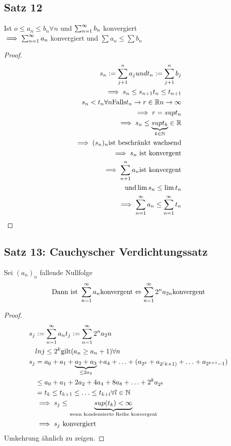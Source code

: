 \subsection{Satz 12}
Ist $o \le a_n \le b_n \forall n$ und $\sum_{n=1}^{\infty} b_n$ konvergiert \\
$ \implies \sum_{n=1}^{\infty} a_n$ konvergiert und $ \sum a_n \le \sum b_n$ \\
\begin{proof}
 \begin{equation}
  \begin{split}
    s_n := \sum_{j+1}^n a_j und t_n := \sum_{j+1}^n b_j \\
    \implies s_n \le s_{n+1} t_n \le t_{n+1} \\
    s_n < t_n \forall n 
    \text{Falls} t_n \to r \in \mathbb{R} n \to \infty \\
    \implies r = sup t_n \\
    \implies s_n \le \underbrace{sup t_k}_{k \in \mathbb{N}} \in \mathbb{R} \\
    \implies (s_n)_n \text{ist beschränkt wachsend} \\
    \implies s_n \text{ ist konvergent} \\
    \implies \sum_{n+1}^n a_n \text{ist konvergent} \\
    \text{und} \lim s_n \le \lim t_n \\
    \implies \sum_{n=1}^{\infty} a_n \le \sum_{n=1}^{\infty} t_n
   \end{split}
 \end{equation}
\end{proof}

\subsection{Satz 13: Cauchyscher Verdichtungssatz}
Sei $(a_n)_n$ fallende Nullfolge
\begin{equation}
 \text{Dann ist } \sum_{n=1}^{\infty} a_n \text{konvergent} \Leftrightarrow \sum_{n=1}^{\infty} 2^n a_{2n} \text{konvergent}
\end{equation}

\begin{proof}
 \begin{equation}
  \begin{split}
   s_j & := \sum_{n=1}^{\infty} a_n t_j := \sum_{n=1}^{\infty} 2^n a_2n \\
   & ln  j \le 2^k \text{gilt} (a_n \ge a_n+1) \forall n \\
   s_j &= a_0 + a_1 + \underbrace{a_2 + a_3}_{\le 2a_2} + a_4 + \ldots + (a_{2^k} + a_{2^(k+1)} + \ldots + a_{2^{k+1}-1}) \\
   & \le a_0 + a_1 + 2a_2 + 4 a_4 + 8 a_8 + \ldots + 2^k a_{2^k} \\
   & =t_k \le t_{k+1} \le \ldots \le t_{k+l} \forall l \in \mathbb{N} \\
   & \implies s_j \le \underbrace{sup(t_k) < \infty}_{\text{wenn kondensierte Reihe konvergent}} \\
   & \implies s_j \text{ konvergiert}
  \end{split}
 \end{equation}
Umkehrung ähnlich zu zeigen.
\end{proof}
